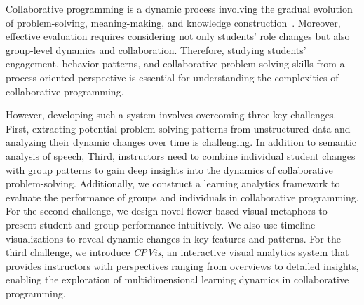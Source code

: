 Collaborative programming is a dynamic process involving the gradual evolution of problem-solving, meaning-making, and knowledge construction~\cite{ma2022detecting}. 
Moreover, effective evaluation requires considering not only students' role changes but also group-level dynamics and collaboration. Therefore, studying students' engagement, behavior patterns, and collaborative problem-solving skills from a process-oriented perspective is essential for understanding the complexities of collaborative programming.

However, developing such a system involves overcoming three key challenges. 
First, extracting potential problem-solving patterns from unstructured data and analyzing their dynamic changes over time is challenging. In addition to semantic analysis of speech,   
Third, instructors need to combine individual student changes with group patterns to gain deep insights into the dynamics of collaborative problem-solving.
Additionally, we construct a learning analytics framework to evaluate the performance of groups and individuals in collaborative programming.  
For the second challenge, we design novel flower-based visual metaphors to present student and group performance intuitively. We also use timeline visualizations to reveal dynamic changes in key features and patterns.  
For the third challenge, we introduce \textit{CPVis}, an interactive visual analytics system that provides instructors with perspectives ranging from overviews to detailed insights, enabling the exploration of multidimensional learning dynamics in collaborative programming. 

